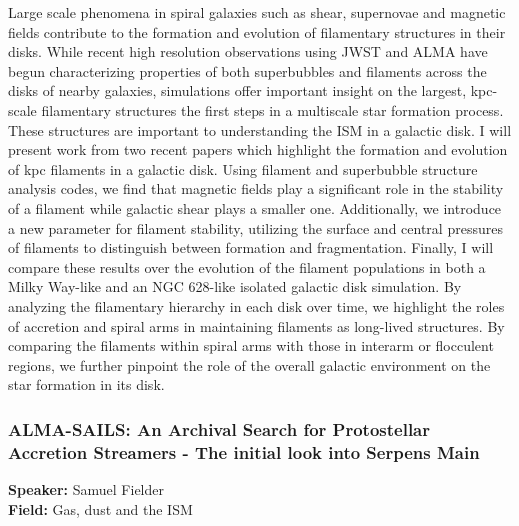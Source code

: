 Large scale phenomena in spiral galaxies such as shear, supernovae and magnetic fields contribute to the formation and evolution of filamentary structures in their disks. While recent high resolution observations using JWST and ALMA have begun characterizing properties of both superbubbles and filaments across the disks of nearby galaxies, simulations offer important insight on the largest, kpc-scale filamentary structures the first steps in a multiscale star formation process. These structures are important to understanding the ISM in a galactic disk. I will present work from two recent papers which highlight the formation and evolution of kpc filaments in a galactic disk. Using filament and superbubble structure analysis codes, we find that magnetic fields play a significant role in the stability of a filament while galactic shear plays a smaller one. Additionally, we introduce a new parameter for filament stability, utilizing the surface and central pressures of filaments to distinguish between formation and fragmentation. Finally, I will compare these results over the evolution of the filament populations in both a Milky Way-like and an NGC 628-like isolated galactic disk simulation. By analyzing the filamentary hierarchy in each disk over time, we highlight the roles of accretion and spiral arms in maintaining filaments as long-lived structures. By comparing the filaments within spiral arms with those in interarm or flocculent regions, we further pinpoint the role of the overall galactic environment on the star formation in its disk.

\hypertarget{abstract-talk-328}{}\label{abstract-page-talk-328}
\subsubsection*{ALMA-SAILS: An Archival Search for Protostellar Accretion Streamers - The initial look into Serpens Main}
\textbf{Speaker:} Samuel Fielder\\
\textbf{Field:} Gas, dust and the ISM

